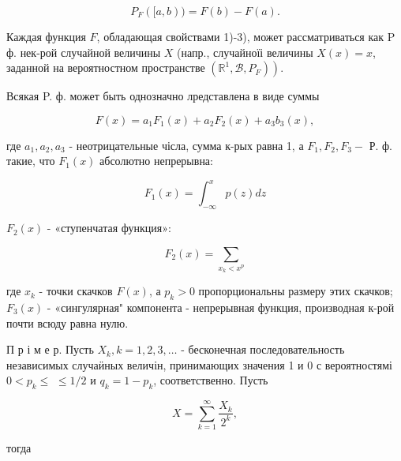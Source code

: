 \documentclass[10pt]{article}
\begin{document}
\[

P_{F}([a, b))=F(b)-F(a) .

\]



Каждая функция $F$, обладающая свойствами 1)-3), может рассматриваться как $\mathrm{P}$ ф. нек-рой случайной величины $X$ (напр., случайноїі величины $X(x)=x$, заданной на вероятностном пространстве $\left.\left(\mathbb{R}^{1}, \mathscr{B}, P_{F}\right)\right)$.



Всякая P. ф. может быть однозначно лредставлена в виде суммы



\[

F(x)=a_{1} F_{1}(x)+a_{2} F_{2}(x)+a_{3} b_{3}(x),

\]



где $a_{1}, a_{2}, a_{3}$ - неотрицательные чісла, сумма к-рых равна 1, а $F_{1}, F_{2}, F_{3}-$ Р. ф. такие, что $F_{1}(x)$ абсолютно непрерывна:



\[

F_{1}(x)=\int_{-\infty}^{x} p(z) d z

\]



$F_{2}(x)$ - «ступенчатая функция»:



\[

F_{2}(x)=\sum_{x_{k}<x^{p}}

\]



где $x_{k}$ - точки скачков $F(x)$, а $p_{k}>0$ пропорциональны размеру этих скачков; $F_{3}(x)$ - «сингулярная" компонента - непрерывная функция, производная к-рой почти всюду равна нулю.



П р і м е р. Пусть $X_{k}, k=1,2,3, \ldots$ - бесконечная последовательность независимых случаӥных величін, принимающих значения 1 и 0 с вероятностямі $0<p_{k} \leqslant$ $\leqslant 1 / 2$ и $q_{k}=1-p_{k}$, соответственно. Пусть



\[

X=\sum_{k=1}^{\infty} \frac{X_{k}}{2^{k}},

\]



тогда
\end{document}
